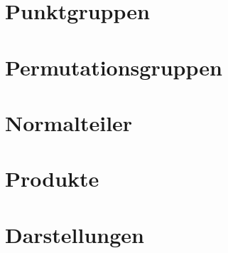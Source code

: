 %
%
%

\section{Punktgruppen}

\section{Permutationsgruppen}

\section{Normalteiler}

\section{Produkte}

\section{Darstellungen}
